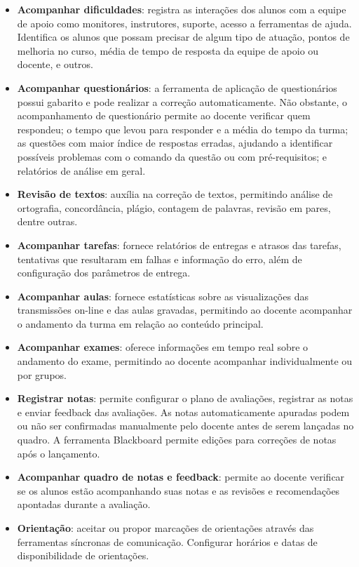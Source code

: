 \begin{itemize}
\item \textbf{Acompanhar dificuldades}: registra as interações dos alunos com a equipe de apoio como monitores, instrutores, suporte, acesso a ferramentas de ajuda. Identifica os alunos que possam precisar de algum tipo de atuação, pontos de melhoria no curso, média de tempo de resposta da equipe de apoio ou docente, e outros. 

\item \textbf{Acompanhar questionários}: a ferramenta de aplicação de questionários possui gabarito e pode realizar a correção automaticamente. Não obstante, o acompanhamento de questionário permite ao docente verificar quem respondeu; o tempo que levou para responder e a média do tempo da turma; as questões com maior índice de respostas erradas, ajudando a identificar possíveis problemas com o comando da questão ou com pré-requisitos; e relatórios de análise em geral.

\item \textbf{Revisão de textos}: auxília na correção de textos, permitindo análise de ortografia, concordância, plágio, contagem de palavras, revisão em pares, dentre outras.

\item \textbf{Acompanhar tarefas}: fornece relatórios de entregas e atrasos das tarefas, tentativas que resultaram em falhas e informação do erro, além de configuração dos parâmetros de entrega.

\item \textbf{Acompanhar aulas}: fornece estatísticas sobre as visualizações das transmissões on-line e das aulas gravadas, permitindo ao docente acompanhar o andamento da turma em relação ao conteúdo principal.

\item \textbf{Acompanhar exames}: oferece informações em tempo real sobre o andamento do exame, permitindo ao docente acompanhar individualmente ou por grupos. 

\item \textbf{Registrar notas}: permite configurar o plano de avaliações, registrar as notas e enviar feedback das avaliações. As notas automaticamente apuradas podem ou não  ser confirmadas manualmente pelo docente antes de serem lançadas no quadro. A ferramenta Blackboard permite edições para correções de notas após o lançamento.

\item \textbf{Acompanhar quadro de notas e feedback}: permite ao docente verificar se os alunos estão acompanhando suas notas e as revisões e recomendações apontadas durante a avaliação.

\item \textbf{Orientação}: aceitar ou propor marcações de orientações através das ferramentas síncronas de comunicação. Configurar horários e datas de disponibilidade de orientações.

\end{itemize}

